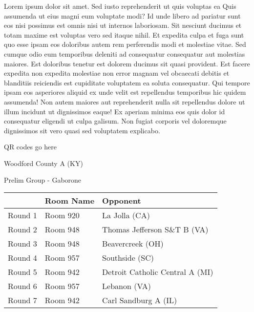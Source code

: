 \documentclass{article}%
\begin{document}
\vspace*{8pt}%
\linebreak%
\newline%
\newline%
Lorem ipsum dolor sit amet. Sed iusto reprehenderit ut quis voluptas ea Quis assumenda ut eius magni eum voluptate modi? Id unde libero ad pariatur sunt eos nisi possimus est omnis nisi ut internos laboriosam. Sit nesciunt ducimus et totam maxime est voluptas vero sed itaque nihil. Et expedita culpa et fuga sunt quo esse ipsam eos doloribus autem rem perferendis modi et molestiae vitae.\newline%
\newline%
Sed cumque odio eum temporibus deleniti ad consequatur consequatur aut molestias maiores. Est doloribus tenetur est dolorem ducimus sit quasi provident. Est facere expedita non expedita molestiae non error magnam vel obcaecati debitis et blanditiis reiciendis est cupiditate voluptatem ea soluta consequatur. Qui tempore ipsam eos asperiores aliquid ex unde velit est repellendus temporibus hic quidem assumenda!\newline%
\newline%
Non autem maiores aut reprehenderit nulla sit repellendus dolore ut illum incidunt ut dignissimos eaque! Ex aperiam minima eos quis dolor id consequatur eligendi ut culpa galisum. Non fugiat corporis vel doloremque dignissimos sit vero quasi sed voluptatem explicabo.\newline%
\newline%
%
\vspace*{30pt}%
\begin{center}%
\begin{Huge}%
QR codes go here%
\end{Huge}%
\end{center}%
\newpage%
%
\begin{center}%
\begin{Huge}%
Woodford County A (KY)%
\end{Huge}%
\vspace*{8pt}%
\linebreak%
\begin{Large}%
Prelim Group {-} Gaborone%
\end{Large}%
\end{center}%
\begin{tabularx}{\textwidth}{|c|Y|Y|}%
\hline%
&Room Name&Opponent\\%
\hline%
Round 1&Room 920&La Jolla (CA)\\%
Round 2&Room 948&Thomas Jefferson S\&T B (VA)\\%
Round 3&Room 948&Beavercreek (OH)\\%
Round 4&Room 957&Southside (SC)\\%
Round 5&Room 942&Detroit Catholic Central A (MI)\\%
Round 6&Room 957&Lebanon (VA)\\%
Round 7&Room 942&Carl Sandburg A (IL)\\%
\hline%
\end{tabularx}%
\end{document}
